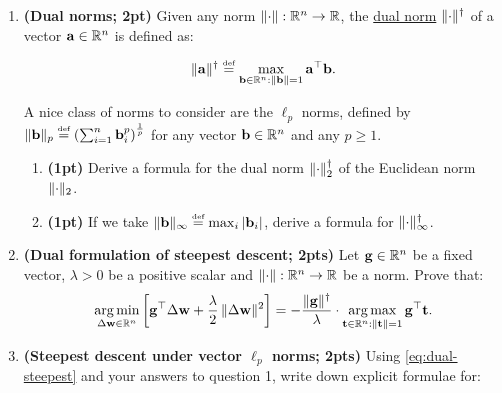 \documentclass[12pt,letterpaper]{article}
\begin{document}
\begin{enumerate}
    \item \textbf{(Dual norms; 2pt)}
    Given any norm $\Vert {\cdot} \Vert:\mathbb{R}^n \to \mathbb{R}$, the
    \href{https://en.wikipedia.org/wiki/Dual_norm}{dual norm} $\Vert {\cdot} \Vert^{\dagger}$ of a vector ${\mathbf{a}}\in\mathbb{R}^n$ is defined as:

    \begin{equation}
        \Vert {{\mathbf{a}}} \Vert^\dagger \overset{\mbox{\normalfont\tiny def}}{=} \max_{{\mathbf{b}} \in \mathbb{R}^n : \Vert {{\mathbf{b}}} \Vert = 1} {\mathbf{a}}^\top {\mathbf{b}}.
    \end{equation}

    A nice class of norms to consider are the $\ell_p$ norms, defined by $\Vert {{\mathbf{b}}} \Vert_p \overset{\mbox{\normalfont\tiny def}}{=} \left(\sum_{i=1}^n {\mathbf{b}}_i^p\right)^\frac{1}{p}$ for any vector ${\mathbf{b}} \in \mathbb{R}^n$ and any $p\geq 1.$

    \begin{enumerate}
        \item \textbf{(1pt)} Derive a formula for the dual norm $\Vert {\cdot} \Vert_2^\dagger$ of the Euclidean norm $\Vert {\cdot} \Vert_2$.

        \item \textbf{(1pt)} If we take $\Vert {{\mathbf{b}}} \Vert_\infty \overset{\mbox{\normalfont\tiny def}}{=} \max_i |{\mathbf{b}}_i|$, derive a formula for $\Vert {\cdot} \Vert_\infty^\dagger$.
    \end{enumerate}
    
    \item \textbf{(Dual formulation of steepest descent; 2pts)} Let ${\mathbf{g}}\in\mathbb{R}^n$ be a fixed vector, $\lambda>0$ be a positive scalar and $\Vert {\cdot} \Vert:\mathbb{R}^n \to \mathbb{R}$ be a norm. Prove that:
    \begin{align}\label{eq:dual-steepest}
    \operatorname*{arg\,min}_{\Delta {\mathbf{w}} \in \mathbb{R}^n} \left[{\mathbf{g}}^\top \Delta {\mathbf{w}} + \frac{\lambda}{2} \, \Vert {\Delta {\mathbf{w}}} \Vert^2 \right] = - \frac{\Vert {{\mathbf{g}}} \Vert^\dagger}{\lambda} \cdot \operatorname*{arg\,max}_{{\mathbf{t}}\in\mathbb{R}^n:\Vert {{\mathbf{t}}} \Vert=1} {\mathbf{g}}^\top {\mathbf{t}}.
    \end{align}
    
    
    

    \item \textbf{(Steepest descent under vector $\ell_p$ norms; 2pts)} Using \cref{eq:dual-steepest} and your answers to question 1, write down explicit formulae for:


\end{enumerate}
\end{document}
